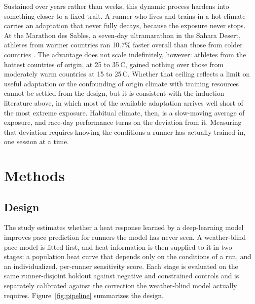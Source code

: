 \documentclass[11pt]{article}
\renewcommand{\_}{\textunderscore\allowbreak}
\begin{document}
Sustained over years rather than weeks, this dynamic process hardens into something closer to a fixed trait. A runner who lives and trains in a hot climate carries an adaptation that never fully decays, because the exposure never stops. At the Marathon des Sables, a seven-day ultramarathon in the Sahara Desert, athletes from warmer countries ran 10.7\% faster overall than those from colder countries \citep{ioannou2018}. The advantage does not scale indefinitely, however: athletes from the hottest countries of origin, at 25 to 35\,\textdegree C, gained nothing over those from moderately warm countries at 15 to 25\,\textdegree C. Whether that ceiling reflects a limit on useful adaptation or the confounding of origin climate with training resources cannot be settled from the design, but it is consistent with the induction literature above, in which most of the available adaptation arrives well short of the most extreme exposure. Habitual climate, then, is a slow-moving average of exposure, and race-day performance turns on the deviation from it. Measuring that deviation requires knowing the conditions a runner has actually trained in, one session at a time.

\section{Methods}
\label{sec:methods}

\subsection{Design}

The study estimates whether a heat response learned by a deep-learning model improves pace prediction for runners the model has never seen. A weather-blind pace model is fitted first, and heat information is then supplied to it in two stages: a population heat curve that depends only on the conditions of a run, and an individualized, per-runner sensitivity score. Each stage is evaluated on the same runner-disjoint holdout against negative and constrained controls and is separately calibrated against the correction the weather-blind model actually requires. Figure~\ref{fig:pipeline} summarizes the design.
\end{document}
